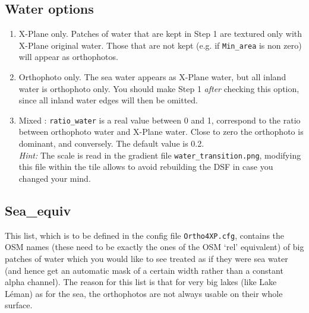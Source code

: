 \documentclass[12pt]{article}
\begin{document}
\subsection{Water options}
\begin{enumerate}
  \item X-Plane only. Patches of water that are kept in Step 1 are textured only with X-Plane original water. Those that are not kept (e.g. if {\tt Min\_area} is non zero) will appear as orthophotos.
  
  \item  Orthophoto only. The sea water appears as X-Plane water, but all inland water is orthophoto only. You should make Step 1 {\it after} checking this option, since all inland water edges will then be omitted.
  \item Mixed : {\tt ratio\_water} is a real value between 0 and 1, correspond to the ratio between orthophoto water and X-Plane water. Close to zero the orthophoto is dominant, and conversely.  The default value is 0.2.\\
  {\it Hint:} The scale is read in the gradient file {\tt water\_transition.png}, modifying this file within the tile allows to avoid rebuilding the DSF in case you changed your mind.
\end{enumerate}
\subsection{Sea\_equiv}
This list, which is to be defined in the config file {\tt Ortho4XP.cfg}, contains the OSM names
(these need to be exactly the ones of the OSM `rel' equivalent) of big patches of water which you would like to see treated as if they were sea water (and hence get an automatic mask of a certain width rather than a constant alpha channel).
The reason for this list is that for very big lakes (like Lake L\'eman) as for the sea, the orthophotos are not always usable on their whole surface.
\end{document}
